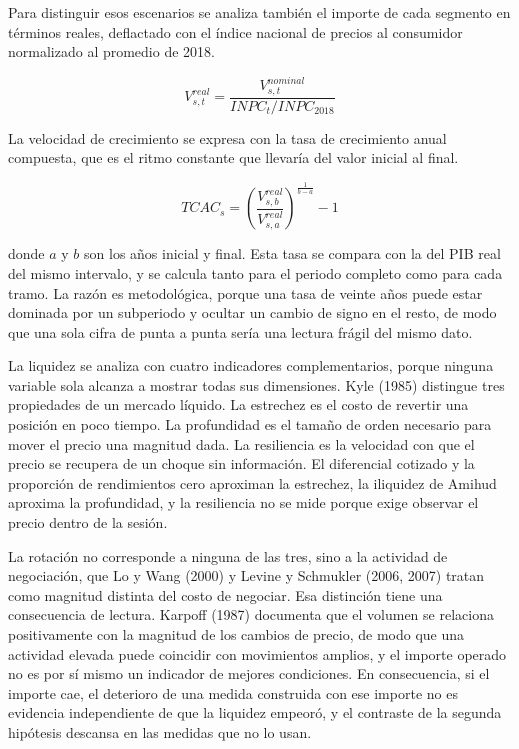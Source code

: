 Para distinguir esos escenarios se analiza también el importe de cada segmento en términos reales, deflactado con el índice nacional de precios al consumidor normalizado al promedio de 2018.

\begin{equation}V_{s,t}^{real} = \frac{V_{s,t}^{nominal}}{INPC_{t}/INPC_{2018}}\tag{2}\end{equation}

La velocidad de crecimiento se expresa con la tasa de crecimiento anual compuesta, que es el ritmo constante que llevaría del valor inicial al final.

\begin{equation}TCAC_{s} = \left( \frac{V_{s,b}^{real}}{V_{s,a}^{real}} \right)^{\frac{1}{b - a}} - 1\tag{3}\end{equation}

donde $a$ y $b$ son los años inicial y final. Esta tasa se compara con la del PIB real del mismo intervalo, y se calcula tanto para el periodo completo como para cada tramo. La razón es metodológica, porque una tasa de veinte años puede estar dominada por un subperiodo y ocultar un cambio de signo en el resto, de modo que una sola cifra de punta a punta sería una lectura frágil del mismo dato.


La liquidez se analiza con cuatro indicadores complementarios, porque ninguna variable sola alcanza a mostrar todas sus dimensiones. Kyle (1985) distingue tres propiedades de un mercado líquido. La estrechez es el costo de revertir una posición en poco tiempo. La profundidad es el tamaño de orden necesario para mover el precio una magnitud dada. La resiliencia es la velocidad con que el precio se recupera de un choque sin información. El diferencial cotizado y la proporción de rendimientos cero aproximan la estrechez, la iliquidez de Amihud aproxima la profundidad, y la resiliencia no se mide porque exige observar el precio dentro de la sesión.

La rotación no corresponde a ninguna de las tres, sino a la actividad de negociación, que Lo y Wang (2000) y Levine y Schmukler (2006, 2007) tratan como magnitud distinta del costo de negociar. Esa distinción tiene una consecuencia de lectura. Karpoff (1987) documenta que el volumen se relaciona positivamente con la magnitud de los cambios de precio, de modo que una actividad elevada puede coincidir con movimientos amplios, y el importe operado no es por sí mismo un indicador de mejores condiciones. En consecuencia, si el importe cae, el deterioro de una medida construida con ese importe no es evidencia independiente de que la liquidez empeoró, y el contraste de la segunda hipótesis descansa en las medidas que no lo usan.

